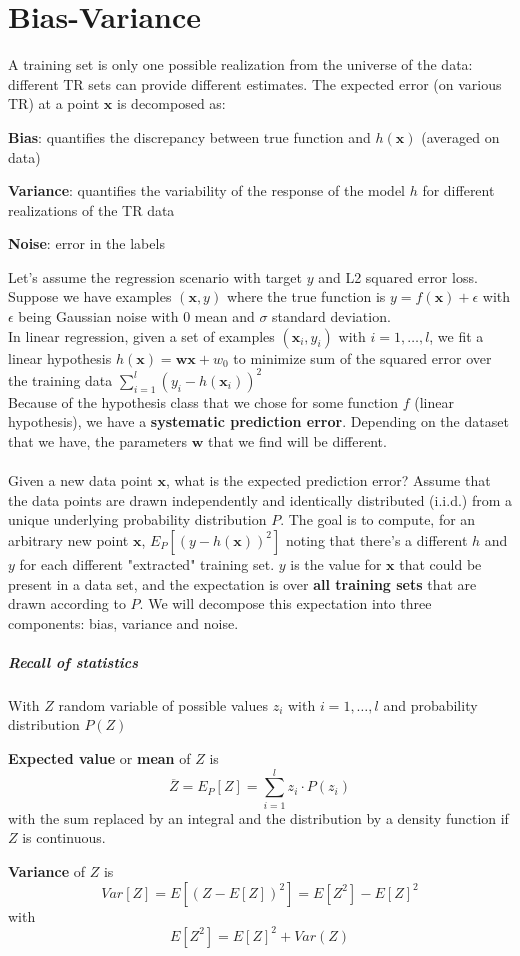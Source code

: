 \documentclass[10pt]{report}
\begin{document}
\section{Bias-Variance} A training set is only one possible realization from the universe of the data: different TR sets can provide different estimates. The expected error (on various TR) at a point $\mathbf{x}$ is decomposed as:
\begin{list}{}{}
	\item \textbf{Bias}: quantifies the discrepancy between true function and $h(\mathbf{x})$ (averaged on data)
	\item \textbf{Variance}: quantifies the variability of the response of the model $h$ for different realizations of the TR data
	\item \textbf{Noise}: error in the labels
\end{list}
Let's assume the regression scenario with target $y$ and L2 squared error loss. Suppose we have examples $(\mathbf{x},y)$ where the true function is $y = f(\mathbf{x}) + \epsilon$ with $\epsilon$ being Gaussian noise with 0 mean and $\sigma$ standard deviation.\\
In linear regression, given a set of examples $(\mathbf{x}_i,y_i)$ with $i = 1,\ldots,l$, we fit a linear hypothesis $h(\mathbf{x}) = \mathbf{wx} + w_0$ to minimize sum of the squared error over the training data $\sum_{i=1}^l (y_i - h(\mathbf{x}_i))^2$\\
Because of the hypothesis class that we chose for some function $f$ (linear hypothesis), we have a \textbf{systematic prediction error}. Depending on the dataset that we have, the parameters $\mathbf{w}$ that we find will be different.\\\\
Given a new data point $\mathbf{x}$, what is the expected prediction error? Assume that the data points are drawn independently and identically distributed (i.i.d.) from a unique underlying probability distribution $P$. The goal is to compute, for an arbitrary new point $\mathbf{x}$, $E_P[(y - h(\mathbf{x}))^2]$ noting that there's a different $h$ and $y$ for each different "extracted" training set. $y$ is the value for $\mathbf{x}$ that could be present in a data set, and the expectation is over \textbf{all training sets} that are drawn according to $P$. We will decompose this expectation into three components: bias, variance and noise.
\subparagraph{Recall of statistics} With $Z$ random variable of possible values $z_i$ with $i=1,\ldots,l$ and probability distribution $P(Z)$
\begin{list}{}{}
	\item \textbf{Expected value} or \textbf{mean} of $Z$ is $$\overline{Z} = E_P[Z] = \sum_{i=1}^l z_i\cdot P(z_i)$$ with the sum replaced by an integral and the distribution by a density function if $Z$ is continuous.
	\item \textbf{Variance} of $Z$ is $$Var[Z] = E[(Z - E[Z])^2] = E[Z^2] - E[Z]^2$$ with $$E[Z^2] = E[Z]^2 + Var(Z)$$
\end{list}
\end{document}
